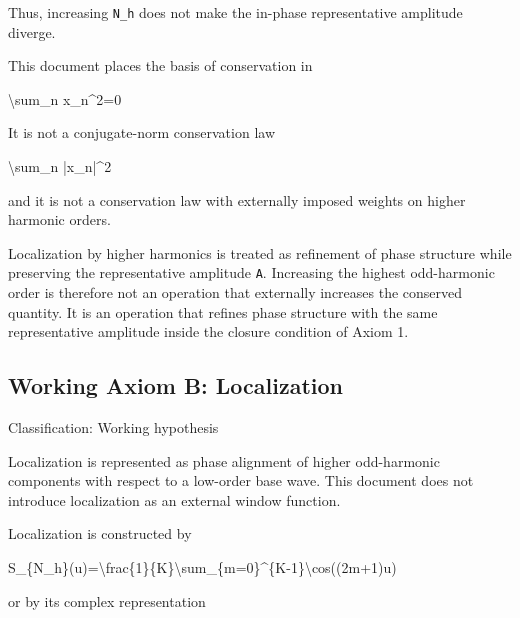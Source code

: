 \documentclass[
  a4paper,
]{article}
\newenvironment{Shaded}{}{}
\newcommand{\NormalTok}[1]{#1}
\begin{document}
Thus, increasing \texttt{N\_h} does not make the in-phase representative
amplitude diverge.

This document places the basis of conservation in

\begin{Shaded}
\begin{Highlighting}[]
\NormalTok{\textbackslash{}sum\_n x\_n\^{}2=0}
\end{Highlighting}
\end{Shaded}

It is not a conjugate-norm conservation law

\begin{Shaded}
\begin{Highlighting}[]
\NormalTok{\textbackslash{}sum\_n |x\_n|\^{}2}
\end{Highlighting}
\end{Shaded}

and it is not a conservation law with externally imposed weights on
higher harmonic orders.

Localization by higher harmonics is treated as refinement of phase
structure while preserving the representative amplitude \texttt{A}.
Increasing the highest odd-harmonic order is therefore not an operation
that externally increases the conserved quantity. It is an operation
that refines phase structure with the same representative amplitude
inside the closure condition of Axiom 1.

\subsection{Working Axiom B:
Localization}\label{working-axiom-b-localization}

Classification: Working hypothesis

Localization is represented as phase alignment of higher odd-harmonic
components with respect to a low-order base wave. This document does not
introduce localization as an external window function.

Localization is constructed by

\begin{Shaded}
\begin{Highlighting}[]
\NormalTok{S\_\{N\_h\}(u)=\textbackslash{}frac\{1\}\{K\}\textbackslash{}sum\_\{m=0\}\^{}\{K{-}1\}\textbackslash{}cos((2m+1)u)}
\end{Highlighting}
\end{Shaded}

or by its complex representation
\end{document}
